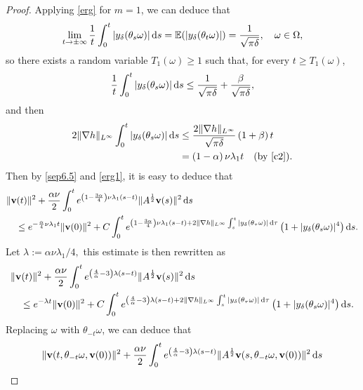 \documentclass{elsarticle}
\theoremstyle{definition}
\numberwithin{equation}{section}
\renewcommand{\d}{{\rm{d}}}
\begin{document}
\begin{proof}
Applying  \eqref{erg} for $m=1$, we can deduce that
\begin{align*}
\lim\limits_{t\rightarrow \pm \infty}\frac{1}{t}\int_0^t|y_{\delta}(\theta_s\omega)| \, \d s=\mathbb{E}(|y_{\delta}(\theta_t\omega)| )=\frac{ 1}{\sqrt{\pi\delta}}
, \quad \omega\in \Omega,
\end{align*}
so    there exists a  random variable  $ T_1(\omega)\geq1$ such that, for every $t\geq T_1(\omega)$,
\begin{align*}
 \frac 1t \int_{0}^t|y_{\delta}(\theta_s\omega)|\, \d s
 \leq  \frac{  1 }{\sqrt{\pi\delta}} + \frac{\beta}{\sqrt{\pi\delta}}     ,
\end{align*}
and then
\begin{align}
2\|\nabla h\|_{L^\infty}\int_{0}^t|y_{\delta}(\theta_s\omega)|\, \d s &\leq
   \frac{2\|\nabla h\|_{L^\infty}  }{ \sqrt{\pi\delta}}  \left( 1 +  \beta  \right ) t  \nonumber \\
   &= \left (1 -  \alpha\right) \nu \lambda_1t \quad \text{(by \eqref{c2})} .\label{erg1}
\end{align}
Then by  \eqref{sep6.5} and \eqref{erg1}, it is easy to deduce that
\begin{align}
&\|\textbf{v}(t)\|^2+\frac {\alpha \nu }2\int_0^te^{ \left(1-\frac{3\alpha} 4\right )\nu  \lambda_1(s-t) }\|A^{\frac12}\textbf{v}(s)\|^2\, \d s\nonumber\\
&\quad \leq e^{ - \frac{\alpha} 4  \nu  \lambda_1t }\|\textbf{v}(0)\|^2
+C\int_0^te^{ \left(1-\frac{3\alpha} 4\right )\nu  \lambda_1(s-t)+2\|\nabla h\|_{L^\infty}\int_{s}^t|y_{\delta}(\theta_\tau\omega)|\, \d \tau}  \left (1+|y_{\delta}(\theta_s\omega)|^4 \right)   \d s. \nonumber
\end{align}
Let  $\lambda:= \alpha \nu    \lambda_1 /4, $
 this estimate is then rewritten as
\begin{align*}
&\|\textbf{v}(t)\|^2+\frac {\alpha \nu } 2\int_0^te^{ \left( \frac 4 \alpha -3  \right) \lambda (s-t)}\|A^{\frac12}\textbf{v}(s)\|^2\, \d s\nonumber\\
 &\quad\leq e^{-\lambda t}\|\textbf{v}(0)\|^2
 +C\int_0^te^{ \left( \frac 4 \alpha -3  \right) \lambda (s-t)+2\|\nabla h\|_{L^\infty}\int_{s}^t|y_{\delta}(\theta_\tau\omega)|\, \d \tau}  \left (1+|y_{\delta}(\theta_s\omega)|^4 \right)  \d s. \nonumber
\end{align*}
Replacing $\omega$ with $\theta_{-t}\omega$, we can deduce that
 \begin{align*}
&\|\textbf{v}(t, \theta_{-t}\omega, \textbf{v}(0))\|^2+\frac {\alpha  \nu }2\int_0^te^{ \left( \frac 4 \alpha -3  \right) \lambda (s-t)}\|A^{\frac12}\textbf{v}(s, \theta_{-t}\omega, \textbf{v}(0))\|^2\, \d s\nonumber\\

\end{align*}
\end{proof}
\end{document}
